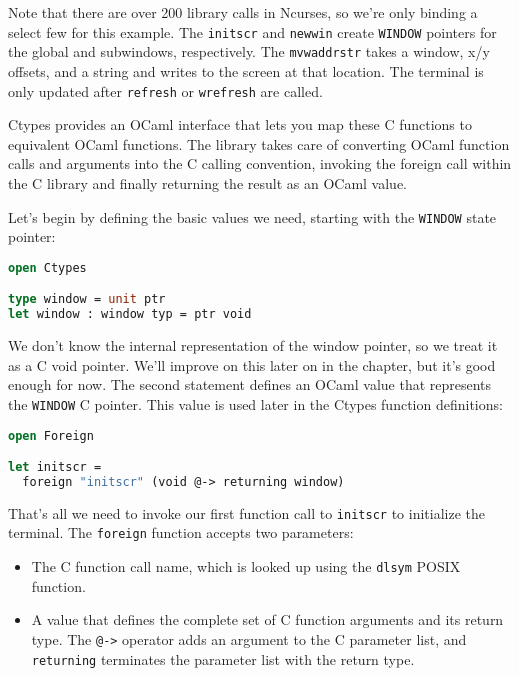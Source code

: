 Note that there are over 200 library calls in Ncurses, so we're only
binding a select few for this example. The
\passthrough{\lstinline!initscr!} and \passthrough{\lstinline!newwin!}
create \passthrough{\lstinline!WINDOW!} pointers for the global and
subwindows, respectively. The \passthrough{\lstinline!mvwaddrstr!} takes
a window, x/y offsets, and a string and writes to the screen at that
location. The terminal is only updated after
\passthrough{\lstinline!refresh!} or \passthrough{\lstinline!wrefresh!}
are called.

Ctypes provides an OCaml interface that lets you map these C functions
to equivalent OCaml functions. The library takes care of converting
OCaml function calls and arguments into the C calling convention,
invoking the foreign call within the C library and finally returning the
result as an OCaml value.

Let's begin by defining the basic values we need, starting with the
\passthrough{\lstinline!WINDOW!} state pointer:

\begin{lstlisting}[language=Caml]
open Ctypes

type window = unit ptr
let window : window typ = ptr void
\end{lstlisting}

We don't know the internal representation of the window pointer, so we
treat it as a C void pointer. We'll improve on this later on in the
chapter, but it's good enough for now. The second statement defines an
OCaml value that represents the \passthrough{\lstinline!WINDOW!} C
pointer. This value is used later in the Ctypes function definitions:

\begin{lstlisting}[language=Caml]
open Foreign

let initscr =
  foreign "initscr" (void @-> returning window)
\end{lstlisting}

That's all we need to invoke our first function call to
\passthrough{\lstinline!initscr!} to initialize the terminal. The
\passthrough{\lstinline!foreign!} function accepts two parameters:

\begin{itemize}
\item
  The C function call name, which is looked up using the
  \passthrough{\lstinline!dlsym!} POSIX function.
\item
  A value that defines the complete set of C function arguments and its
  return type. The \passthrough{\lstinline!@->!} operator adds an
  argument to the C parameter list, and
  \passthrough{\lstinline!returning!} terminates the parameter list with
  the return type.
\end{itemize}

